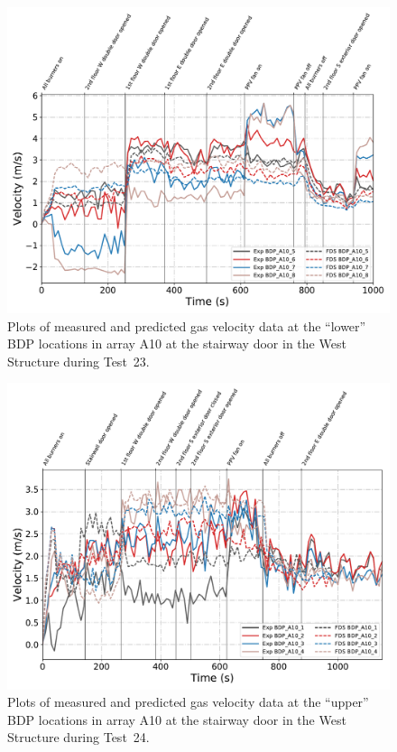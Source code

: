 \begin{figure}[!h]
	\centering
	\includegraphics[width=\columnwidth]{Figures/Plots/Validation/Velocity/Test_23_BDP_A10_lower}
	\caption[Plots of measured and predicted gas velocity data at ``lower'' BDP locations in A10 during Test~23.]{Plots of measured and predicted gas velocity data at the ``lower'' BDP locations in array A10 at the stairway door in the West Structure during Test~23.}
	\label{fig:Test23_lower_BDPs}
\end{figure}

\begin{figure}[!h]
	\centering
	\includegraphics[width=\columnwidth]{Figures/Plots/Validation/Velocity/Test_24_BDP_A10_upper}
	\caption[Plots of measured and predicted gas velocity data at ``upper'' BDP locations in A10 during Test~24.]{Plots of measured and predicted gas velocity data at the ``upper'' BDP locations in array A10 at the stairway door in the West Structure during Test~24.}
	\label{fig:Test24_upper_BDPs}
\end{figure}

